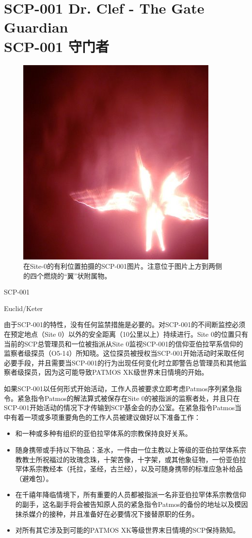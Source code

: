 \chapter[SCP-001 守门者]{
	SCP-001 Dr. Clef - The Gate Guardian \\
	SCP-001 守门者
}

\label{chap:SCP-001.the.gate.guardian}

\begin{figure}[H]
    \centering
    \includegraphics[width=0.5\linewidth]{images/SCP-001-the-gate-guardian.jpg}
    \caption*{在Site-0的有利位置拍摄的SCP-001图片。注意位于图片上方到两侧的四个燃烧的“翼”状附属物。}
\end{figure}

SCP-001

Euclid\slash Keter

由于SCP-001的特性，没有任何监禁措施是必要的。对SCP-001的不间断监控必须在预定地点（Site 0）以外的安全距离（10公里以上）持续进行。Site 0的位置只有当前的SCP总管理员和一位被指派从Site 0监视SCP-001的信仰亚伯拉罕系信仰的监察者级探员（O5-14）所知晓。这位探员被授权当SCP-001开始活动时采取任何必要手段，并且需要当SCP-001的行为出现任何变化时立即警告总管理员和其他监察者级探员，因为这可能导致PATMOS XK级世界末日情境的开始。

如果SCP-001以任何形式开始活动，工作人员被要求立即考虑Patmos序列紧急指令。紧急指令Patmos的解法算式被保存在Site 0的被指派的监察者处，并且只在SCP-001开始活动的情况下才传输到SCP基金会的办公室。在紧急指令Patmos当中有着一项或多项重要角色的工作人员被建议做好以下准备工作：

\begin{itemize}
\item 和一种或多种有组织的亚伯拉罕体系的宗教保持良好关系。
\item 随身携带或手持以下物品：圣水，一件由一位主教以上等级的亚伯拉罕体系宗教教士所祝福过的玫瑰念珠，十架苦像，十字架，或其他象征物，一份亚伯拉罕体系宗教经本（托拉，圣经，古兰经），以及可随身携带的标准应急补给品（避难包）。
\item 在千禧年降临情境下，所有重要的人员都被指派一名非亚伯拉罕体系宗教信仰的副手，这名副手将会被告知原人员的紧急指令Patmos的备份的地址以及模因抹杀媒介的接种，并且准备好在必要情况下接替原职的任务。
\item 对所有其它涉及到可能的PATMOS XK等级世界末日情境的SCP保持熟知。
\end{itemize}

